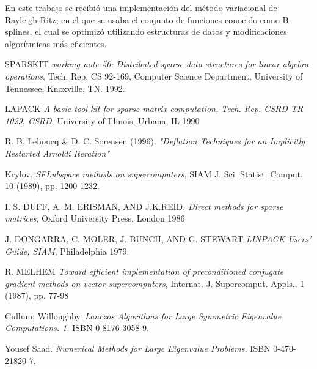 \documentclass[a4paper,openright, 12pt, oneside]{book}
\begin{document}
En este trabajo se recibi\'o una implementaci\'on del m\'etodo variacional de Rayleigh-Ritz, en el que se usaba el conjunto de funciones conocido como B-splines, el cual se optimiz\'o utilizando estructuras de datos y modificaciones algor\'itmicas m\'as eficientes.


\tableofcontents 














\begin{thebibliography}{X}

  SPARSKIT 
  \emph{working note 50: Distributed sparse data structures for linear algebra operations},
  Tech. Rep. CS 92-169, Computer Science Department, University of Tennessee, Knoxville, TN.
  1992.

  LAPACK 
  \emph{A basic tool kit for sparse matrix computation, Tech. Rep. CSRD TR 1029, CSRD},
  University of Illinois, Urbana, IL
  1990

    R. B. Lehoucq \& D. C. Sorensen (1996). 
    \emph{"Deflation Techniques for an Implicitly Restarted Arnoldi Iteration"}

  Krylov,
  \emph{SFLubspace methods on supercomputers},
  SIAM J. Sci. Statist. Comput.
  10 (1989), pp. 1200-1232.

  I. S. DUFF, A. M. ERISMAN, AND J.K.REID,
  \emph{Direct methods for sparse matrices},
  Oxford University Press, London
  1986

  J. DONGARRA, C. MOLER, J. BUNCH, AND G. STEWART
  \emph{LINPACK Users' Guide, SIAM},
  Philadelphia
  1979.

  R. MELHEM
  \emph{Toward efficient implementation of preconditioned conjugate gradient methods on vector supercomputers},
  Internat. J. Supercomput. Appls., 1 (1987), pp. 77-98

  Cullum; Willoughby. 
  \emph{Lanczos Algorithms for Large Symmetric Eigenvalue Computations. 1.} 
  ISBN 0-8176-3058-9.

  Yousef Saad. 
  \emph{Numerical Methods for Large Eigenvalue Problems.} 
  ISBN 0-470-21820-7.


\end{thebibliography}
\end{document}
